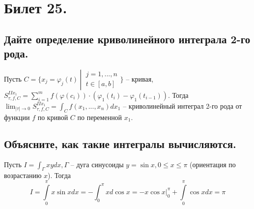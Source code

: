 \section{Билет 25.}

\subsection{Дайте определение криволинейного интеграла 2-го рода.}
Пусть $C = \{ x_j = \varphi_j(t) \> \left| \>
    \begin{matrix}
        j = 1, ..., n \\
        t \in [a, b]
    \end{matrix}
\right. \}$ -- кривая, $S_{\tau, f, C}^{II x_1} = \sum_{i=1}^m f(\varphi(c_i)) \cdot (\varphi_1(t_i) - \varphi_1(t_{i-1}))$.
Тогда $\lim_{|\tau| \to 0} S_{\tau, f, C}^{II x_1} = \int_{C} f(x_1, ..., x_n) dx_1$ -- криволинейный интеграл 2-го рода от функции $f$ по кривой $C$ по переменной $x_1$.

\subsection{Объясните, как такие интегралы вычисляются.}
Пусть $I = \int_{\Gamma} xy dx, \Gamma$ -- дуга синусоиды $y = \sin x, 0 \leqslant x \leqslant \pi$ (ориентация по возрастанию $x$). Тогда
\[
    I = \int \limits_{0}^{\pi} x \sin x dx = - \int_{0}^{\pi} x d \cos x = \left. -x \cos x \right|_0^{\pi} + \int \limits_0^{\pi} \cos x dx = \pi
\]